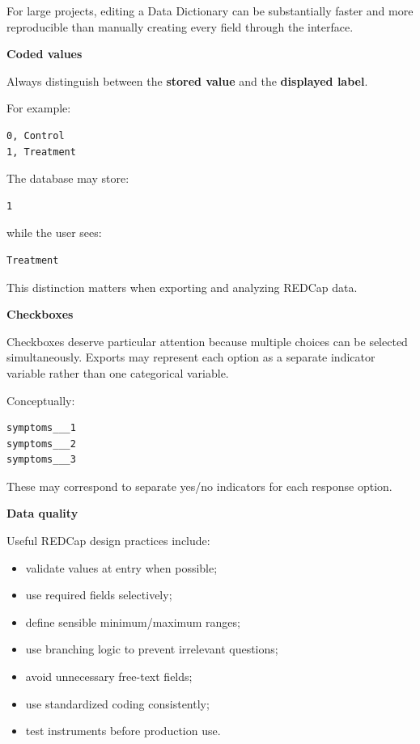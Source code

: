 \documentclass[11pt,letterpaper]{article}
\begin{document}
For large projects, editing a Data Dictionary can be substantially faster and
more reproducible than manually creating every field through the interface.

\textbf{Coded values}

Always distinguish between the \textbf{stored value} and the
\textbf{displayed label}.

For example:

\begin{lstlisting}
0, Control
1, Treatment
\end{lstlisting}

The database may store:

\begin{lstlisting}
1
\end{lstlisting}

while the user sees:

\begin{lstlisting}
Treatment
\end{lstlisting}

This distinction matters when exporting and analyzing REDCap data.

\textbf{Checkboxes}

Checkboxes deserve particular attention because multiple choices can be
selected simultaneously. Exports may represent each option as a separate
indicator variable rather than one categorical variable.

Conceptually:

\begin{lstlisting}
symptoms___1
symptoms___2
symptoms___3
\end{lstlisting}

These may correspond to separate yes/no indicators for each response option.

\textbf{Data quality}

Useful REDCap design practices include:

\begin{itemize}[leftmargin=*]
    \item validate values at entry when possible;
    \item use required fields selectively;
    \item define sensible minimum/maximum ranges;
    \item use branching logic to prevent irrelevant questions;
    \item avoid unnecessary free-text fields;
    \item use standardized coding consistently;
    \item test instruments before production use.
\end{itemize}
\end{document}
